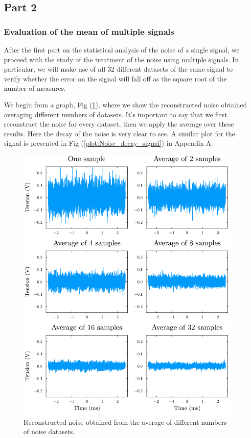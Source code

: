 \documentclass[a4paper,12pt]{article}
\begin{document}
\subsection{Part 2}
\subsubsection{Evaluation of the mean of multiple signals}
\par After the first part on the statistical analysis of the noise of a single signal, 
we proceed with the study of the treatment of the noise using multiple signals. 
In particular, we will make use of all 32 different datasets of the same signal to 
verify whether the error on the signal will fall off as the square root of the number of measures.

\par We begin from a graph, Fig (\ref{plot:Noise_decay_only_noise}), where we show the 
reconstructed noise obtained averaging different numbers of datasets. It's important to say 
that we first reconstruct the noise for every dataset, then we apply the average over these results. 
Here the decay of the noise is very clear to see. 
A similar plot for the signal is presented in Fig (\ref{plot:Noise_decay_signal}) in Appendix A.
\begin{figure}[H]
    \centering
    \includegraphics[width=1\textwidth]{Error_fix.pdf}
    \caption{Reconstructed noise obtained from the average of different numbers of noise datasets.}
    \label{plot:Noise_decay_only_noise}
\end{figure}
\end{document}
